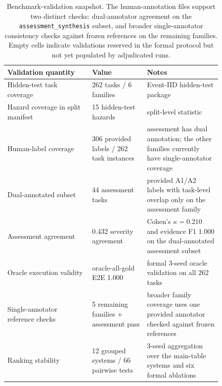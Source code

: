 \documentclass{article}
\begin{document}
\begin{table}[ht]
    \centering
    \small
\caption{Benchmark-validation snapshot. The human-annotation files support two distinct checks: dual-annotator agreement on the \texttt{assessment\_synthesis} subset, and broader single-annotator consistency checks against frozen references on the remaining families. Empty cells indicate validations reserved in the formal protocol but not yet populated by adjudicated runs.}
    \label{tab:benchmark-validation}
    \begin{tabular}{L{0.34\linewidth}L{0.22\linewidth}L{0.30\linewidth}}
        \toprule
        Validation quantity & Value & Notes \\
        \midrule
        Hidden-test task coverage & 262 tasks / 6 families & Event-IID hidden-test package \\
        Hazard coverage in split manifest & 15 hidden-test hazards & split-level statistic \\
        Human-label coverage & 306 provided labels / 262 task instances & assessment has dual annotation; the other families currently have single-annotator coverage \\
        Dual-annotated subset & 44 assessment tasks & provided A1/A2 labels with task-level overlap only on the assessment family \\
        Assessment agreement & 0.432 severity agreement & Cohen's $\kappa=0.210$ and evidence F1 1.000 on the dual-annotated assessment subset \\
        Oracle execution validity & oracle-all-gold E2E 1.000 & formal 3-seed oracle validation on all 262 tasks \\
        Single-annotator reference checks & 5 remaining families + assessment pass & broader family coverage uses one provided annotator checked against frozen references \\
        Ranking stability & 12 grouped systems / 66 pairwise tests & 3-seed aggregation over the main-table systems and six formal ablations \\
        \bottomrule
    \end{tabular}
\end{table}
\end{document}
